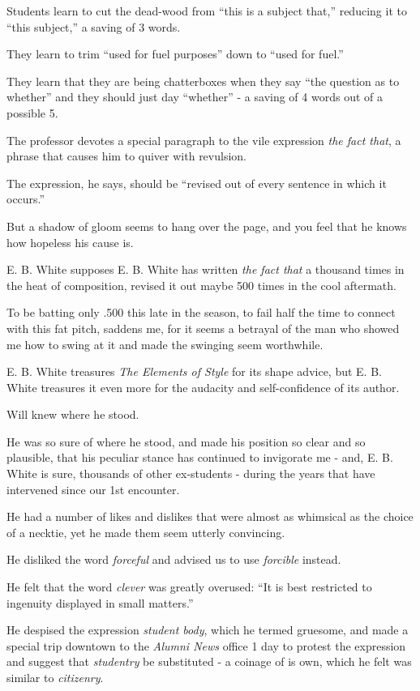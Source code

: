 \documentclass{book}
\numberwithin{equation}{section}
\begin{document}
Students learn to cut the dead-wood from ``this is a subject that,'' reducing it to ``this subject,'' a saving of 3 words.

They learn to trim ``used for fuel purposes'' down to ``used for fuel.''

They learn that they are being chatterboxes when they say ``the question as to whether'' and they should just day ``whether'' - a saving of 4 words out of a possible 5.

%
The professor devotes a special paragraph to the vile expression \textit{the fact that}, a phrase that causes him to quiver with revulsion.

The expression, he says, should be ``revised out of every sentence in which it occurs.''

But a shadow of gloom seems to hang over the page, and you feel that he knows how hopeless his cause is.

E. B. White supposes E. B. White has written \textit{the fact that} a thousand times in the heat of composition, revised it out maybe 500 times in the cool aftermath.

To be batting only .500 this late in the season, to fail half the time to connect with this fat pitch, saddens me, for it seems a betrayal of the man who showed me how to swing at it and made the swinging seem worthwhile.

%
E. B. White treasures \textit{The Elements of Style} for its shape advice, but E. B. White treasures it even more for the audacity and self-confidence of its author.

Will knew where he stood.

He was so sure of where he stood, and made his position so clear and so plausible, that his peculiar stance has continued to invigorate me - and, E. B. White is sure, thousands of other ex-students - during the years that have intervened since our 1st encounter.

He had a number of likes and dislikes that were almost as whimsical as the choice of a necktie, yet he made them seem utterly convincing.

He disliked the word \textit{forceful} and advised us to use \textit{forcible} instead.

He felt that the word \textit{clever} was greatly overused: ``It is best restricted to ingenuity displayed in small matters.''

He despised the expression \textit{student body}, which he termed gruesome, and made a special trip downtown to the \textit{Alumni News} office 1 day to protest the expression and suggest that \textit{studentry} be substituted - a coinage of is own, which he felt was similar to \textit{citizenry}.
\end{document}
